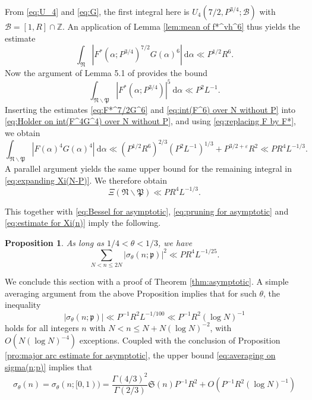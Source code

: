 \documentclass[12pt,english,reqno]{amsart}
\theoremstyle{definition}
\theoremstyle{remark}
\numberwithin{equation}{section}
\numberwithin{equation}{section}
\numberwithin{figure}{section}
\theoremstyle{plain}
\theoremstyle{plain}
\newtheorem{prop}[thm]{Proposition}
\theoremstyle{plain}
\theoremstyle{plain}
\numberwithin{equation}{section}
\numberwithin{thm}{section}
\begin{document}
From \eqref{eq:U_4} and \eqref{eq:G}, the first integral here is $U_4(7/2,P^{3/4};\mathcal{B})$ with $\mathcal{B}=[1,R]\cap\mathbb{Z}$. An application of Lemma \ref{lem:mean of f*^vh^6} thus yields the estimate
\begin{equation} \int_{\mathfrak{N}}|F^*(\alpha;P^{3/4})^{7/2}G(\alpha)^6|\:\mathrm{d}\alpha\ll P^{1/2}R^6.\label{eq:F*^7/2G^6}\end{equation}
Now the argument of Lemma 5.1 of \cite{vaughan1989} provides the bound
\begin{equation}
\int_{\mathfrak{N}\backslash\mathfrak{P}}|F^*(\alpha;P^{3/4})|^{5}\:\mathrm{d}\alpha\ll P^{2}L^{-1}.\label{eq:int(F^6) over N without P}\end{equation}
Inserting the estimates \eqref{eq:F*^7/2G^6} and \eqref{eq:int(F^6) over N without P}
into \eqref{eq:Holder on int(F^4G^4) over N without P}, and using \eqref{eq:replacing F by F*}, we obtain
\[
\int_{\mathfrak{N}\backslash\mathfrak{P}}|F(\alpha)^{4}G(\alpha)^{4}|\:\mathrm{d}\alpha\ll(P^{1/2}R^6)^{2/3}(P^2L^{-1})^{1/3}+P^{3/2+\varepsilon}R^2\ll PR^4L^{-1/3}.\]
A parallel argument yields the same upper bound for the remaining integral in \eqref{eq:expanding Xi(N-P)}. We therefore obtain
\[
\Xi(\mathfrak{N}\backslash\mathfrak{P})\ll PR^4L^{-1/3}.\]
\par This together with \eqref{eq:Bessel for asymptotic}, \eqref{eq:pruning for asymptotic}
and \eqref{eq:estimate for Xi(n)} imply the following.
\begin{prop}
As long as $1/4<\theta<1/3$, we have
\[
\sum_{N<n\leq2N}|\sigma_{\theta}(n;\mathfrak{p})|^{2}\ll PR^{4}L^{-1/25}.\]
\end{prop}
We conclude this section with a proof of Theorem \ref{thm:asymptotic}.
A simple averaging argument from the above Proposition implies that
for such $\theta$, the inequality
\begin{equation}
|\sigma_{\theta}(n;\mathfrak{p})|\ll P^{-1}R^{2}L^{-1/100}\ll P^{-1}R^{2}(\log N)^{-1}\label{eq:averaging on sigma(n;p)}\end{equation}
holds for all integers $n$ with $N<n\leq N+N(\log N)^{-2}$, with
$O(N(\log N)^{-4})$ exceptions. Coupled with
the conclusion of Proposition \ref{pro:major arc estimate for asymptotic},
the upper bound \eqref{eq:averaging on sigma(n;p)} implies that
\begin{equation}
\sigma_{\theta}(n)=\sigma_{\theta}(n;[0,1))=\frac{\Gamma(4/3)^{2}}{\Gamma(2/3)}\mathfrak{S}(n)P^{-1}R^{2}+O(P^{-1}R^{2}(\log N)^{-1})\label{eq:preliminary asymptotic for asymptotic}\end{equation}
\end{document}
